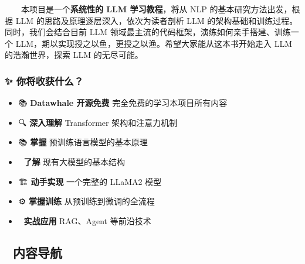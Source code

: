 \documentclass[12pt,a4paper]{book}
\begin{document}
  本项目是一个\textbf{系统性的 LLM 学习教程}，将从 NLP
的基本研究方法出发，根据 LLM 的思路及原理逐层深入，依次为读者剖析 LLM
的架构基础和训练过程。同时，我们会结合目前 LLM
领域最主流的代码框架，演练如何亲手搭建、训练一个
LLM，期以实现授之以鱼，更授之以渔。希望大家能从这本书开始走入 LLM
的浩瀚世界，探索 LLM 的无尽可能。

\subsubsection{✨
你将收获什么？}\label{ux4f60ux5c06ux6536ux83b7ux4ec0ux4e48}

\begin{itemize}
\tightlist
\item
  📚 \textbf{Datawhale 开源免费} 完全免费的学习本项目所有内容
\item
  🔍 \textbf{深入理解} Transformer 架构和注意力机制
\item
  📚 \textbf{掌握} 预训练语言模型的基本原理
\item
  🧠 \textbf{了解} 现有大模型的基本结构
\item
  🏗️ \textbf{动手实现} 一个完整的 LLaMA2 模型
\item
  ⚙️ \textbf{掌握训练} 从预训练到微调的全流程
\item
  🚀 \textbf{实战应用} RAG、Agent 等前沿技术
\end{itemize}

\subsection{📖 内容导航}\label{ux5185ux5bb9ux5bfcux822a}
\end{document}
